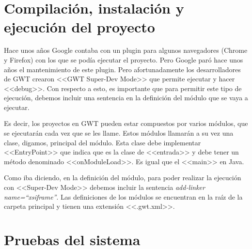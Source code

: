 \section{Compilación, instalación y ejecución del proyecto}

Hace unos años Google contaba con un plugin para algunos navegadores (Chrome y Firefox) con los que se podía ejecutar el proyecto. Pero Google paró hace unos años el mantenimiento de este plugin. Pero afortunadamente los desarrolladores de GWT crearon <<GWT Super-Dev Mode>> que permite ejecutar y hacer <<debug>>. Con respecto a esto, es importante que para permitir este tipo de ejecución, debemos incluir una sentencia en la definición del módulo que se vaya a ejecutar.

Es decir, los proyectos en GWT pueden estar compuestos por varios módulos, que se ejecutarán cada vez que se les llame. Estos módulos llamarán a su vez una clase, digamos, principal del módulo. Esta clase debe implementar <<EntryPoint>> que indica que es la clase de <<entrada>> y debe tener un método denominado <<onModuleLoad>>. Es igual que el <<main>> en Java.

Como iba diciendo, en la definición del módulo, para poder realizar la ejecución con <<Super-Dev Mode>> debemos incluir la sentencia \textit{add-linker name=``xsiframe''}. Las definiciones de los módulos se encuentran en la raíz de la carpeta principal y tienen una extensión <<.gwt.xml>>.

\section{Pruebas del sistema}
